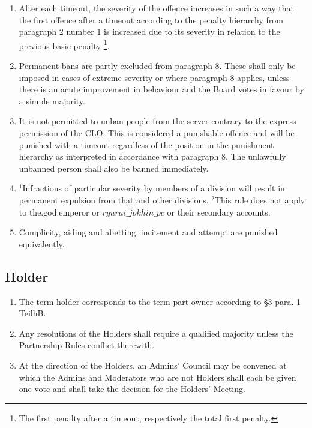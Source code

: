 \documentclass{article}
\begin{document}
\begin{enumerate}[(1)]
    \item After each timeout, the severity of the offence increases in such a way that the first offence after a timeout according to the penalty hierarchy from paragraph 2 number 1  is increased due to its severity in relation to the previous basic penalty \footnote{The first penalty after a timeout, respectively the total first penalty.}.
	\item Permanent bans are partly excluded from paragraph 8. These shall only be imposed in cases of extreme severity or where paragraph 8 applies, unless there is an acute improvement in behaviour and the Board votes in favour by a simple majority.
	\item It is not permitted to unban people from the server contrary to the express permission of the CLO. This is considered a punishable offence and will be punished with a timeout regardless of the position in the punishment hierarchy as interpreted in accordance with paragraph 8. The unlawfully unbanned person shall also be banned immediately.
	\item $^{1}$Infractions of particular severity by members of a division will result in permanent expulsion from that and other divisions. $^{2}$This rule does not apply to the.god.emperor or $ryurai\_jokhin\_pc$ or their secondary accounts.
	\item Complicity, aiding and abetting, incitement and attempt are punished equivalently.
\end{enumerate}

\subsection{Holder}
\begin{enumerate}[(1)]
	\item The term holder corresponds to the term part-owner according to §3 para. 1 TeilhB.
	\item Any resolutions of the Holders shall require a qualified majority unless the Partnership Rules conflict therewith.
	\item At the direction of the Holders, an Admins' Council may be convened at which the Admins and Moderators who are not Holders shall each be given one vote and shall take the decision for the Holders' Meeting.
\end{enumerate}
\end{document}
